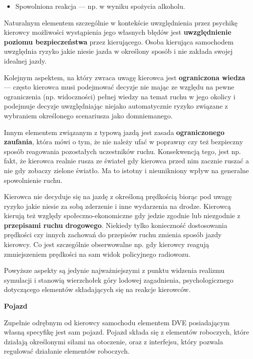 {{{\begin{itemize}
\item Spowolniona reakcja --- np. w wyniku spożycia alkoholu.
\end{itemize}
}
\par{
Naturalnym elementem szczególnie w kontekście uwzględnienia przez psychikę kierowcy możliwości wystąpienia jego własnych błędów jest \textbf{uwzględnienie poziomu bezpieczeństwa} przez kierującego. Osoba kierująca samochodem uwzględnia ryzyko jakie niesie jazda w określony sposób i nie zakłada swojej idealnej jazdy.
}
\par{
Kolejnym aspektem, na który zwraca uwagę kierowca jest \textbf{ograniczona wiedza} --- często kierowca musi podejmować decyzje nie mając ze względu na pewne ograniczenia (np. widoczności) pełnej wiedzy na temat ruchu w jego okolicy i podejmuje decyzje uwzględniając niejako automatycznie ryzyko związane z wybraniem określonego scenariusza jako domniemanego.
}
\par{
Innym elementem związanym z typową jazdą jest zasada \textbf{ograniczonego zaufania}, która mówi o tym, że nie należy ufać w poprawny czy też bezpieczny sposób reagowania pozostałych uczestników ruchu. Konsekwencją tego, jest np. fakt, że kierowca realnie rusza ze świateł gdy kierowca przed nim zacznie ruszać a nie gdy zobaczy zielone światło. Ma to istotny i nieunikniony wpływ na generalne spowolnienie ruchu.
}
\par{
Kierowca nie decyduje się na jazdę z określoną prędkością biorąc pod uwagę ryzyko jakie niesie za sobą zderzenie i inne wydarzenia na drodze. Kierowcą kierują też względy społeczno-ekonomiczne gdy jedzie zgodnie lub niezgodnie z \textbf{przepisami ruchu drogowego}. Niekiedy tylko konieczność dostosowania prędkości czy innych zachowań do przepisów ruchu zmienia sposób jazdy kierowcy. Co jest szczególnie obserwowalne np. gdy kierowcy reagują zmniejszeniem prędkości na sam widok policyjnego radiowozu.
}
\par{
Powyższe aspekty są jedynie najważniejszymi z punktu widzenia realizmu symulacji i stanowią wierzchołek góry lodowej zagadnienia, psychologicznego dotyczącego elementów składających się na reakcje kierowców.
}
\par{ }
\par{
\textbf{Pojazd}
}
\par{
Zupełnie odrębnym od kierowcy samochodu elementem DVE posiadającym własną specyfikę jest sam pojazd. Pojazd składa się z elementów roboczych, które działają określonymi siłami na otoczenie, oraz z interfejsu, który pozwala regulować działanie elementów roboczych.
}}}
